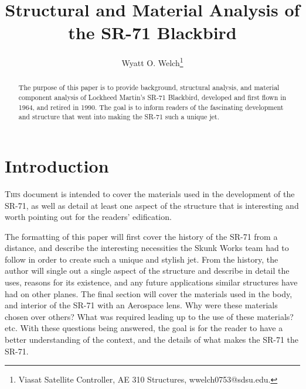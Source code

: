 \documentclass[conf]{new-aiaa}
\title{Structural and Material Analysis of the SR-71 Blackbird}
\author{Wyatt O. Welch\footnote{Viasat Satellite Controller, AE 310 Structures, wwelch0753@sdsu.edu.}}
\affil{SDSU Aerospace Engineering Student, enrolled in AE 310, San Diego, CA, 92115}
\begin{document}
\maketitle

\begin{abstract}
The purpose of this paper is to provide background, structural analysis, and material component analysis of Lockheed Martin's SR-71 Blackbird, developed and first flown in 1964, and retired in 1990. The goal is to inform readers of the fascinating development and structure that went into making the SR-71 such a unique jet.
\end{abstract}

\section{Introduction}
\lettrine{T}{his} document is intended to cover the materials used in the development of the SR-71, as well as detail at least one aspect of the structure that is interesting and worth pointing out for the readers' edification.

The formatting of this paper will first cover the history of the SR-71 from a distance, and describe the interesting necessities the Skunk Works team had to follow in order to create such a unique and stylish jet. From the history, the author will single out a single aspect of the structure and describe in detail the uses, reasons for its existence, and any future applications similar structures have had on other planes. The final section will cover the materials used in the body, and interior of the SR-71 with an Aerospace lens. Why were these materials chosen over others? What was required leading up to the use of these materials? etc. With these questions being answered, the goal is for the reader to have a better understanding of the context, and the details of what makes the SR-71 the SR-71.
\end{document}
